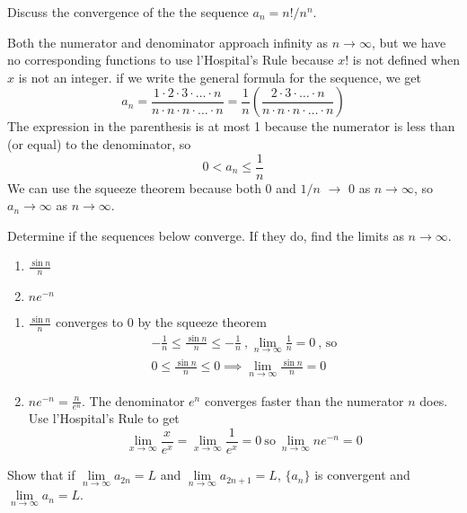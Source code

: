   \begin{example}
    Discuss the convergence of the the sequence $a_n=n!/n^n$.
  \end{example}
  \begin{solution}
    Both the numerator and denominator approach infinity as $n\to\infty$, but we have no corresponding functions to use l'Hospital's Rule because $x!$ is not defined when $x$ is not an integer. if we write the general formula for the sequence, we get
    $$a_n = \frac{1\cdot2\cdot3\cdot\ldots\cdot n}{n\cdot n\cdot n\cdot\ldots\cdot n} = \frac{1}{n}\left(\frac{2\cdot3\cdot\ldots\cdot n}{n\cdot n\cdot n\cdot\ldots\cdot n}\right)$$
    The expression in the parenthesis is at most 1 because the numerator is less than (or equal) to the denominator, so
    $$0<a_n \leq \frac{1}{n}$$
    We can use the squeeze theorem because both 0 and $1/n$ $\to$ 0 as $n\to\infty$, so $a_n \to \infty$ as $n\to\infty$.
  \end{solution}
  \begin{example}
    Determine if the sequences below converge. If they do, find the limits as $n\to\infty$.
    \begin{enumerate}
      \item $\frac{\sin n}{n}$
      \item $ne^{-n}$
    \end{enumerate}
  \end{example}
  \begin{solution}
    \begin{enumerate}
      \item $\frac{\sin n}{n}$ converges to 0 by the squeeze theorem
            \begin{gather*}
               -\frac{1}{n}\leq\frac{\sin n}{n}\leq-\frac{1}{n}\ \text{,}\ \lim_{n\to\infty}\frac{1}{n}=0\ \text{, so} \\
               0 \leq\frac{\sin n}{n}\leq 0 \implies \lim_{n\to\infty}\frac{\sin n}{n}=0
            \end{gather*}
      \item $ne^{-n} = \frac{n}{e^n}$. The denominator $e^n$ converges faster than the numerator $n$ does. Use l'Hospital's Rule to get $$\lim_{x\to\infty}\frac{x}{e^x} = \lim_{x\to\infty}\frac{1}{e^x} = 0\ \text{so}\ \lim_{n\to\infty}ne^{-n} = 0$$
    \end{enumerate}
  \end{solution}
  \begin{example}
    Show that if $\lim\limits_{n \to \infty}a_{2n} = L$ and $\lim\limits_{n \to \infty}a_{2n+1} = L$, $\{a_n\}$ is convergent and $\lim\limits_{n \to \infty}a_n = L$.
  \end{example}
